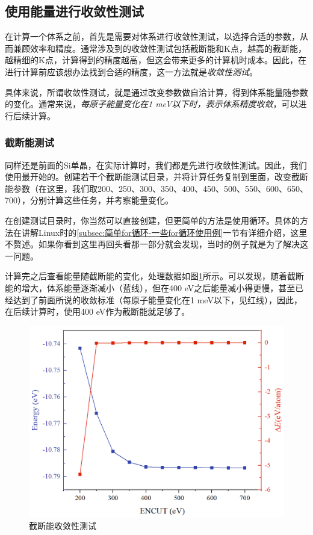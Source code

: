 \subsection{使用能量进行收敛性测试}\label{subsec:能量计算-使用能量进行收敛性测试}

在计算一个体系之前，首先是需要对体系进行收敛性测试，以选择合适的参数，从而兼顾效率和精度。通常涉及到的收敛性测试包括截断能和K点，越高的截断能，越精细的K点，计算得到的精度越高，但这会带来更多的计算机时成本。因此，在进行计算前应该想办法找到合适的精度，这一方法就是\emph{收敛性测试}。

具体来说，所谓收敛性测试，就是通过改变参数做自洽计算，得到体系能量随参数的变化。通常来说，\emph{每原子能量变化在1 meV以下时，表示体系精度收敛}，可以进行后续计算。

\subsubsection{截断能测试}

同样还是前面的Si单晶，在实际计算时，我们都是先进行收敛性测试。因此，我们使用最开始的。创建若干个截断能测试目录，并将计算任务复制到里面，改变截断能参数（在这里，我们取200、250、300、350、400、450、500、550、600、650、700），分别计算这些任务，并考察能量变化。

\begin{extend}
    在创建测试目录时，你当然可以直接创建，但更简单的方法是使用循环。具体的方法在讲解Linux时的\ref{subsec:简单for循环-一些for循环使用例}一节有详细介绍，这里不赘述。如果你看到这里再回头看那一部分就会发现，当时的例子就是为了解决这一问题。
\end{extend}

计算完之后查看能量随截断能的变化，处理数据如图\ref{fig:能量计算-截断能收敛性测试}所示。可以发现，随着截断能的增大，体系能量逐渐减小（蓝线），但在400 eV之后能量减小得更慢，甚至已经达到了前面所说的收敛标准（每原子能量变化在1 meV以下，见红线），因此，在后续计算时，使用400 eV作为截断能就足够了。

\begin{figure}
    \centering
    \includegraphics[width=1\linewidth]{VASP计算/静态自洽与电荷密度/能量计算/fig/截断能收敛性测试.png}
    \caption{截断能收敛性测试}
    \label{fig:能量计算-截断能收敛性测试}
\end{figure}

